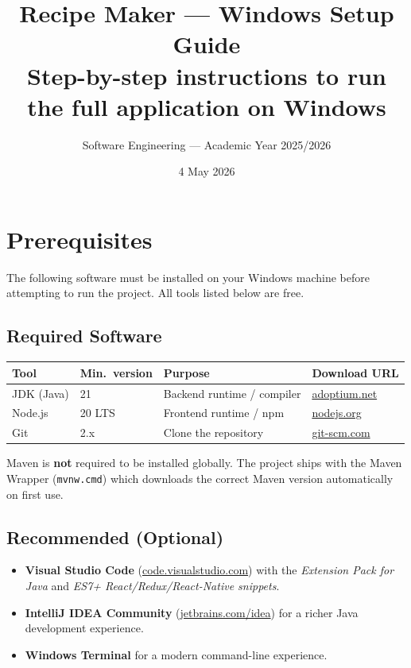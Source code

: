 \documentclass[12pt,a4paper]{article}
\title{\textbf{Recipe Maker — Windows Setup Guide}\\[0.4em]
  \large Step-by-step instructions to run the full application on Windows}
\author{Software Engineering — Academic Year 2025/2026}
\date{4 May 2026}
\begin{document}
\maketitle
\tableofcontents
\newpage

\section{Prerequisites}

The following software must be installed on your Windows machine before
attempting to run the project.  All tools listed below are free.

\subsection{Required Software}

\begin{center}
\begin{tabular}{llll}
\toprule
\textbf{Tool} & \textbf{Min.\ version} & \textbf{Purpose} & \textbf{Download URL} \\
\midrule
JDK (Java) & 21 & Backend runtime / compiler &
  \href{https://adoptium.net}{adoptium.net} \\
Node.js    & 20 LTS & Frontend runtime / npm &
  \href{https://nodejs.org}{nodejs.org} \\
Git        & 2.x & Clone the repository &
  \href{https://git-scm.com}{git-scm.com} \\
\bottomrule
\end{tabular}
\end{center}

\begin{note}
Maven is \textbf{not} required to be installed globally.  The project ships with
the Maven Wrapper (\texttt{mvnw.cmd}) which downloads the correct Maven version
automatically on first use.
\end{note}

\subsection{Recommended (Optional)}

\begin{itemize}[noitemsep]
  \item \textbf{Visual Studio Code} (\href{https://code.visualstudio.com}{code.visualstudio.com})
        with the \emph{Extension Pack for Java} and \emph{ES7+ React/Redux/React-Native snippets}.
  \item \textbf{IntelliJ IDEA Community} (\href{https://www.jetbrains.com/idea}{jetbrains.com/idea})
        for a richer Java development experience.
  \item \textbf{Windows Terminal} for a modern command-line experience.
\end{itemize}
\end{document}
